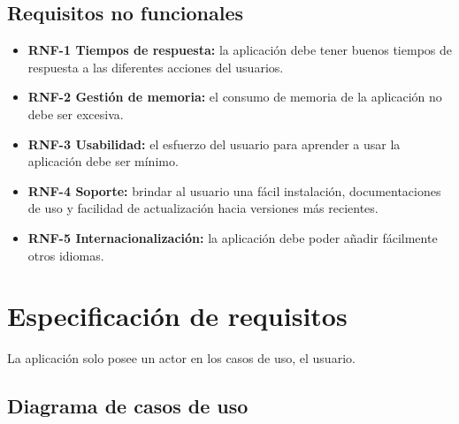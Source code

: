 \subsection{Requisitos no funcionales}

\begin{itemize}
	\item \textbf{RNF-1 Tiempos de respuesta:} la aplicación debe tener buenos tiempos de respuesta a las diferentes acciones del usuarios. 
	\item \textbf{RNF-2 Gestión de memoria:} el consumo de memoria de la aplicación no debe ser excesiva.
	\item \textbf{RNF-3 Usabilidad:} el esfuerzo del usuario para aprender a usar la aplicación debe ser mínimo.
	\item \textbf{RNF-4 Soporte:} brindar al usuario una fácil instalación, documentaciones de uso y facilidad de actualización hacia versiones más recientes.
	\item \textbf{RNF-5 Internacionalización:} la aplicación debe poder añadir fácilmente otros idiomas.
\end{itemize}


\section{Especificación de requisitos}
La aplicación solo posee un actor en los casos de uso, el usuario.
\subsection{Diagrama de casos de uso}
